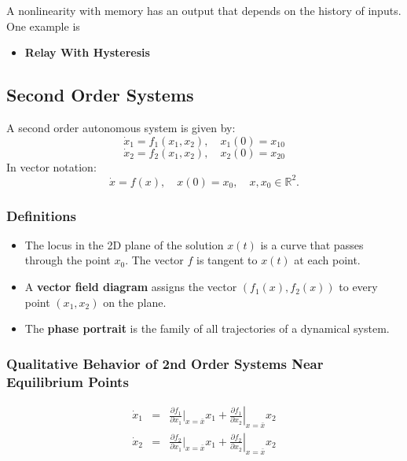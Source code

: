 A nonlinearity with memory has an output that depends on the history of inputs. One example is
\begin{itemize}
    \item \textbf{Relay With Hysteresis}
\end{itemize}

\subsection{Second Order Systems}

A second order autonomous system is given by:
\noindent\begin{equation*}
    \dot{x}_1 = f_1(x_1, x_2), \quad x_1(0) = x_{10}
\end{equation*}
\noindent\begin{equation*}
    \dot{x}_2 = f_2(x_1, x_2), \quad x_2(0) = x_{20}
\end{equation*}
In vector notation:
\noindent\begin{equation*}
    \dot{x} = f(x), \quad x(0) = x_0, \quad x, x_0 \in \mathbb{R}^2.
\end{equation*}

\subsubsection{Definitions}
\begin{itemize}
    \item The locus in the 2D plane of the solution $x(t)$ is a curve that passes through the point $x_0$. The vector $f$ is tangent to $x(t)$ at each point.
    \item A \textbf{vector field diagram} assigns the vector $(f_1(x), f_2(x))$ to every point $(x_1, x_2)$ on the plane.
    \item The \textbf{phase portrait} is the family of all trajectories of a dynamical system.
\end{itemize}

\subsubsection{Qualitative Behavior of 2nd Order Systems Near Equilibrium Points}

\newpar{}

\noindent\begin{equation*}
    \begin{array}
        {rcl}\dot{x}_1 & = & \frac{\partial f_1}{\partial x_1}|_{x=\bar{x}}x_1+\left.\frac{\partial f_1}{\partial x_2}\right|_{x=\bar{x}}x_2 \\
        \dot{x}_2      & = & \frac{\partial f_2}{\partial x_1}|_{x=\bar{x}}x_1+\left.\frac{\partial f_2}{\partial x_2}\right|_{x=\bar{x}}x_2
    \end{array}
\end{equation*}

